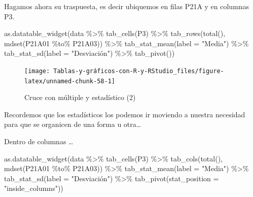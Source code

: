 \documentclass[
]{book}
\newenvironment{Shaded}{\begin{snugshade}}{\end{snugshade}}
\newcommand{\AttributeTok}[1]{\textcolor[rgb]{0.77,0.63,0.00}{#1}}
\newcommand{\FunctionTok}[1]{\textcolor[rgb]{0.00,0.00,0.00}{#1}}
\newcommand{\NormalTok}[1]{#1}
\newcommand{\SpecialCharTok}[1]{\textcolor[rgb]{0.00,0.00,0.00}{#1}}
\newcommand{\StringTok}[1]{\textcolor[rgb]{0.31,0.60,0.02}{#1}}
\begin{document}
Hagamos ahora su traspuesta, es decir ubiquemos en filas P21A y en columnas P3.

\begin{Shaded}
\begin{Highlighting}[]
\FunctionTok{as.datatable\_widget}\NormalTok{(data }\SpecialCharTok{\%\textgreater{}\%} \FunctionTok{tab\_cells}\NormalTok{(P3) }\SpecialCharTok{\%\textgreater{}\%} \FunctionTok{tab\_rows}\NormalTok{(}\FunctionTok{total}\NormalTok{(), }
  \FunctionTok{mdset}\NormalTok{(P21A01 }\SpecialCharTok{\%to\%}\NormalTok{ P21A03)) }\SpecialCharTok{\%\textgreater{}\%} \FunctionTok{tab\_stat\_mean}\NormalTok{(}\AttributeTok{label =} \StringTok{"Media"}\NormalTok{) }\SpecialCharTok{\%\textgreater{}\%} 
  \FunctionTok{tab\_stat\_sd}\NormalTok{(}\AttributeTok{label =} \StringTok{"Desviación"}\NormalTok{) }\SpecialCharTok{\%\textgreater{}\%} \FunctionTok{tab\_pivot}\NormalTok{())}
\end{Highlighting}
\end{Shaded}

\begin{figure}[H]

{\centering \texttt{[image: Tablas-y-gráficos-con-R-y-RStudio\_files/figure-latex/unnamed-chunk-58-1]} 

}

\caption{Cruce con múltiple y estadístico (2)}\label{fig:unnamed-chunk-58}
\end{figure}

Recordemos que los estadísticos los podemos ir moviendo a nuestra necesidad para que se organicen de una forma u otra\ldots{}

Dentro de columnas \ldots{}

\begin{Shaded}
\begin{Highlighting}[]
\FunctionTok{as.datatable\_widget}\NormalTok{(data }\SpecialCharTok{\%\textgreater{}\%} \FunctionTok{tab\_cells}\NormalTok{(P3) }\SpecialCharTok{\%\textgreater{}\%} \FunctionTok{tab\_cols}\NormalTok{(}\FunctionTok{total}\NormalTok{(), }
  \FunctionTok{mdset}\NormalTok{(P21A01 }\SpecialCharTok{\%to\%}\NormalTok{ P21A03)) }\SpecialCharTok{\%\textgreater{}\%} \FunctionTok{tab\_stat\_mean}\NormalTok{(}\AttributeTok{label =} \StringTok{"Media"}\NormalTok{) }\SpecialCharTok{\%\textgreater{}\%} 
  \FunctionTok{tab\_stat\_sd}\NormalTok{(}\AttributeTok{label =} \StringTok{"Desviación"}\NormalTok{) }\SpecialCharTok{\%\textgreater{}\%} \FunctionTok{tab\_pivot}\NormalTok{(}\AttributeTok{stat\_position =} \StringTok{"inside\_columns"}\NormalTok{))}
\end{Highlighting}
\end{Shaded}
\end{document}

